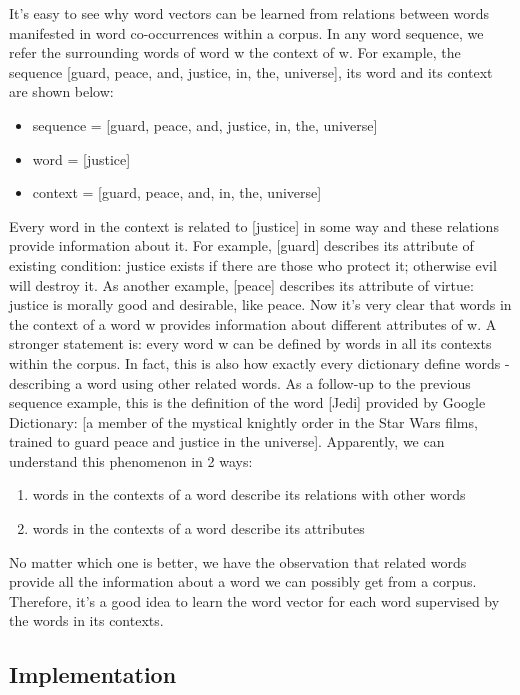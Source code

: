 \documentclass{article}
\begin{document}
It's easy to see why word vectors can be learned from relations between words manifested in word co-occurrences within a corpus. In any word sequence, we refer the surrounding words of word w the context of w. For example, the sequence [guard, peace, and, justice, in, the, universe], its word and its context are shown below:
\begin{itemize}
	\item sequence = [guard, peace, and, justice, in, the, universe]
	\item word = [justice]
	\item context = [guard, peace, and, in, the, universe]
\end{itemize}
Every word in the context is related to [justice] in some way and these relations provide information about it. For example, [guard] describes its attribute of existing condition: justice exists if there are those who protect it; otherwise evil will destroy it. As another example, [peace] describes its attribute of virtue: justice is morally good and desirable, like peace. Now it's very clear that words in the context of a word w provides information about different attributes of w. A stronger statement is: every word w can be defined by words in all its contexts within the corpus. In fact, this is also how exactly every dictionary define words - describing a word using other related words. As a follow-up to the previous sequence example, this is the definition of the word [Jedi] provided by Google Dictionary: [a member of the mystical knightly order in the Star Wars films, trained to guard peace and justice in the universe]. Apparently, we can understand this phenomenon in 2 ways:
\begin{enumerate}
	\item words in the contexts of a word describe its relations with other words
	\item words in the contexts of a word describe its attributes
\end{enumerate}
No matter which one is better, we have the observation that related words provide all the information about a word we can possibly get from a corpus. Therefore, it's a good idea to learn the word vector for each word supervised by the words in its contexts.

\subsection{Implementation}
\end{document}

